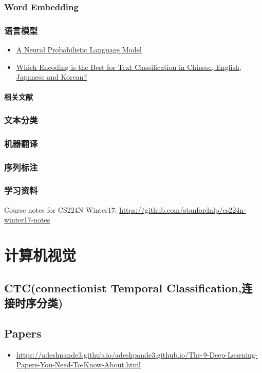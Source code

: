 \documentclass[UTF8,10pt,a4paper]{ctexbook}
\begin{document}
\subsection{Word Embedding}

\subsection{语言模型}
\begin{itemize}
\item \href{http://www.jmlr.org/papers/volume3/bengio03a/bengio03a.pdf}{A Neural Probabilistic Language Model}
\item \href{https://arxiv.org/pdf/1708.02657.pdf}{Which Encoding is the Best for Text Classification in Chinese, English, Japanese and Korean?}
\end{itemize}

\subsubsection{相关文献}



\subsection{文本分类}
\subsection{机器翻译}
\subsection{序列标注}

\subsection{学习资料}
Course notes for CS224N Winter17: \url{https://github.com/stanfordnlp/cs224n-winter17-notes}


\chapter{计算机视觉}

\section{CTC(connectionist Temporal Classification,连接时序分类)}

\section{Papers}
\begin{itemize}
\item \href{The 9 Deep Learning Papers You Need To Know About (Understanding CNNs Part 3)}{https://adeshpande3.github.io/adeshpande3.github.io/The-9-Deep-Learning-Papers-You-Need-To-Know-About.html}
\end{itemize}
\end{document}
